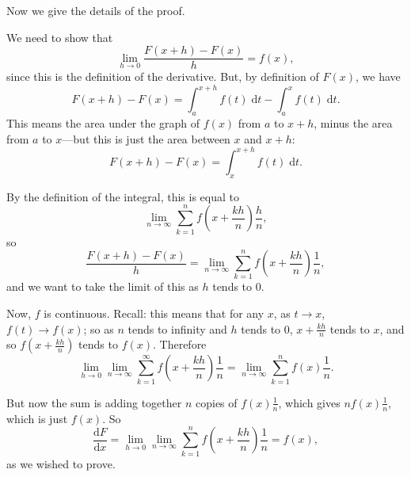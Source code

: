 \documentclass{article}
\newcommand{\deriv}[2]{\frac{\mathrm{d}#1}{\mathrm{d}#2}}
\newcommand{\diff}{\;\mathrm{d}}
\begin{document}
\begin{figure}[h]
{
}

\end{figure}

\clearpage

Now we give the details of the proof.\medskip

We need to show that
\[\lim_{h\to 0}\frac{F(x+h)-F(x)}{h}=f(x),\]
since this is the definition of the derivative. But, by definition of $F(x)$, we have
\[F(x+h)-F(x)=\int_a^{x+h}f(t)\diff t - \int_a^x f(t)\diff t.\]
This means the area under the graph of $f(x)$ from $a$ to $x+h$, minus the area from $a$ to $x$---but this is just the area between $x$ and $x+h$:
\[F(x+h)-F(x)=\int_x^{x+h}f(t)\diff t.\]

By the definition of the integral, this is equal to
\[\lim_{n\to \infty}\sum_{k=1}^n f\left(x+\frac{kh}{n}\right)\frac{h}{n},\]
so
\[\frac{F(x+h)-F(x)}{h}=\lim_{n\to \infty}\sum_{k=1}^n f\left(x+\frac{kh}{n}\right)\frac{1}{n},\]
and we want to take the limit of this as $h$ tends to 0.

Now, $f$ is continuous. Recall: this means that for any $x$, as $t\to x$, $f(t)\to f(x)$; so as $n$ tends to infinity and $h$ tends to 0, $x+\frac{kh}{n}$ tends to $x$, and so $f\left(x+\frac{kh}{n}\right)$ tends to $f(x)$. Therefore
\[\lim_{h\to 0}\lim_{n\to \infty}\sum_{k=1}^\infty f\left(x+\frac{kh}{n}\right)\frac{1}{n}=\lim_{n\to \infty}\sum_{k=1}^n f(x)\frac{1}{n}.\]

But now the sum is adding together $n$ copies of $f(x)\frac{1}{n}$, which gives $nf(x)\frac{1}{n}$, which is just $f(x)$. So
\[\deriv{F}{x}=\lim_{h\to 0}\lim_{n\to \infty}\sum_{k=1}^n f\left(x+\frac{kh}{n}\right)\frac{1}{n}=f(x),\]
as we wished to prove.
\end{document}
